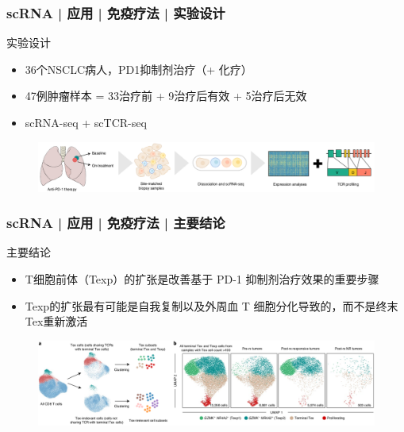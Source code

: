 \documentclass[11pt]{ctexbeamer}
\begin{document}
\begin{frame}
  \frametitle{scRNA | 应用 | 免疫疗法 | 实验设计}
  \begin{block}{实验设计}
    \begin{itemize}
      \item 36个NSCLC病人，PD1抑制剂治疗（+ 化疗）
      \item 47例肿瘤样本 = 33治疗前 + 9治疗后有效 + 5治疗后无效
      \item scRNA-seq + scTCR-seq
    \end{itemize}
  \end{block}
   \begin{figure}
    \centering
    \includegraphics[width=\textwidth]{PD1_NC_01.png}
  \end{figure}
\end{frame}

\begin{frame}
  \frametitle{scRNA | 应用 | 免疫疗法 | 主要结论}
  \begin{block}{主要结论}
      \begin{itemize}
        \item T细胞前体（Texp）的扩张是改善基于 PD-1 抑制剂治疗效果的重要步骤
        \item Texp的扩张最有可能是自我复制以及外周血 T 细胞分化导致的，而不是终末Tex重新激活
      \end{itemize}
  \end{block}
   \begin{figure}
    \centering
    \includegraphics[width=\textwidth]{PD1_NC_02.png}
  \end{figure}
\end{frame}
\end{document}
